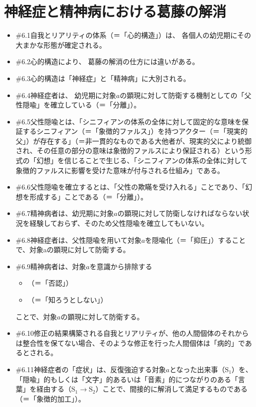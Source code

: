 \section{神経症と精神病における葛藤の解消}\label{ux795eux7d4cux75c7ux3068ux7cbeux795eux75c5ux306bux304aux3051ux308bux845bux85e4ux306eux89e3ux6d88}

\begin{note}{}
  \begin{itemize}
    \tightlist
    \item{\#6.1}自我とリアリティの体系（＝「心的構造」）は、  各個人の幼児期にその大まかな形態が確定される。
    \item{\#6.2}心的構造により、  葛藤の解消の仕方には違いがある。
    \item{\#6.3}心的構造は「神経症」と「精神病」に大別される。
    \item{\#6.4}神経症者は、  幼児期に対象$a$の顕現に対して防衛する機制としての「父性隠喩」を確立している（＝「分離」）。
    \item{\#6.5}父性隠喩とは、「シニフィアンの体系の全体に対して固定的な意味を保証するシニフィアン（＝「象徴的ファルス」）を持つアクター（＝「現実的父」）が存在する」（＝非一貫的なものである大他者が、現実的父により統御され、その任意の部分の意味は象徴的ファルスにより保証される）という形式の「幻想」を信じることで生じる、「シニフィアンの体系の全体に対して象徴的ファルスに影響を受けた意味が付与される仕組み」である。
    \item{\#6.6}父性隠喩を確立するとは、「父性の欺瞞を受け入れる」ことであり、「幻想を形成する」ことである（＝「分離」）。
    \item{\#6.7}精神病者は、幼児期に対象$a$の顕現に対して防衛しなければならない状況を経験しておらず、そのため父性隠喩を確立してもいない。
    \item{\#6.8}神経症者は、父性隠喩を用いて対象$a$を隠喩化（＝「抑圧」）することで、対象aの顕現に対して防衛する。
    \item{\#6.9}精神病者は、対象$a$を意識から排除する
      \begin{itemize}
        \tightlist
        \item （＝「否認」）
        \item （＝「知ろうとしない」）
      \end{itemize}ことで、対象$a$の顕現に対して防衛する。
    \item{\#6.10}修正の結果構築される自我とリアリティが、他の人間個体のそれからは整合性を保てない場合、そのような修正を行った人間個体は「病的」であるとされる。
    \item{\#6.11}神経症者の「症状」は、反復強迫する対象$a$となった出来事（$\textrm{S}_1$）を、「隠喩」的もしくは「文字」的あるいは「音素」的につながりのある「言葉」を経由する（$\textrm{S}_1\rightarrow\textrm{S}_2$）ことで、間接的に解消して満足するものである（＝「象徴的加工」）。

\end{itemize}
\end{note}
